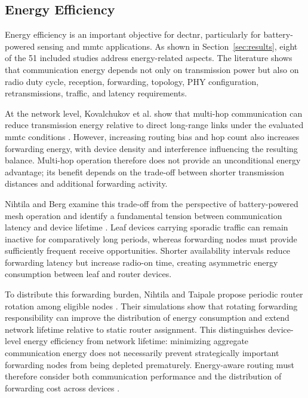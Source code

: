 \subsection{Energy Efficiency}
\label{subsec:energy}

Energy efficiency is an important objective for \gls{dectnr}, particularly
for battery-powered sensing and \gls{mmtc} applications. As shown in
Section~\ref{sec:results}, eight of the 51 included studies address
energy-related aspects. The literature shows that communication energy depends
not only on transmission power but also on radio duty cycle, reception,
forwarding, topology, PHY configuration, retransmissions, traffic, and latency
requirements.

At the network level, Kovalchukov et al. show that multi-hop communication can
reduce transmission energy relative to direct long-range links under the
evaluated \gls{mmtc} conditions
\cite{kovalchukovDECT2020NewRadio2022}. However, increasing routing bias and
hop count also increases forwarding energy, with device density and
interference influencing the resulting balance. Multi-hop operation therefore
does not provide an unconditional energy advantage; its benefit depends on the
trade-off between shorter transmission distances and additional forwarding
activity.

Nihtila and Berg examine this trade-off from the perspective of battery-powered
mesh operation and identify a fundamental tension between communication
latency and device lifetime
\cite{nihtilaEnergyConsumptionDECT20202022}. Leaf devices carrying sporadic
traffic can remain inactive for comparatively long periods, whereas forwarding
nodes must provide sufficiently frequent receive opportunities. Shorter
availability intervals reduce forwarding latency but increase radio-on time,
creating asymmetric energy consumption between leaf and router devices.

To distribute this forwarding burden, Nihtila and Taipale propose periodic
router rotation among eligible nodes
\cite{nihtilaEnergySavingRouter2022}. Their simulations show that rotating
forwarding responsibility can improve the distribution of energy consumption
and extend network lifetime relative to static router assignment. This
distinguishes device-level energy efficiency from network lifetime: minimizing
aggregate communication energy does not necessarily prevent strategically
important forwarding nodes from being depleted prematurely. Energy-aware
routing must therefore consider both communication performance and the
distribution of forwarding cost across devices
\cite{nihtilaEnergyConsumptionDECT20202022,
nihtilaEnergySavingRouter2022}.

